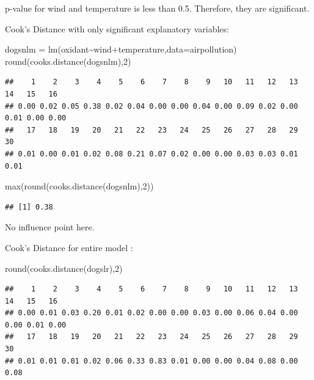 \documentclass[
]{article}
\newenvironment{Shaded}{\begin{snugshade}}{\end{snugshade}}
\newcommand{\AttributeTok}[1]{\textcolor[rgb]{0.77,0.63,0.00}{#1}}
\newcommand{\DecValTok}[1]{\textcolor[rgb]{0.00,0.00,0.81}{#1}}
\newcommand{\FunctionTok}[1]{\textcolor[rgb]{0.00,0.00,0.00}{#1}}
\newcommand{\NormalTok}[1]{#1}
\newcommand{\OtherTok}[1]{\textcolor[rgb]{0.56,0.35,0.01}{#1}}
\newcommand{\SpecialCharTok}[1]{\textcolor[rgb]{0.00,0.00,0.00}{#1}}
\begin{document}
p-value for wind and temperature is less than 0.5. Therefore, they are
significant.

Cook's Distance with only significant explanatory variables:

\begin{Shaded}
\begin{Highlighting}[]
\NormalTok{dogsnlm }\OtherTok{=} \FunctionTok{lm}\NormalTok{(oxidant}\SpecialCharTok{\textasciitilde{}}\NormalTok{wind}\SpecialCharTok{+}\NormalTok{temperature,}\AttributeTok{data=}\NormalTok{airpollution)}
\FunctionTok{round}\NormalTok{(}\FunctionTok{cooks.distance}\NormalTok{(dogsnlm),}\DecValTok{2}\NormalTok{)}
\end{Highlighting}
\end{Shaded}

\begin{verbatim}
##    1    2    3    4    5    6    7    8    9   10   11   12   13   14   15   16 
## 0.00 0.02 0.05 0.38 0.02 0.04 0.00 0.00 0.04 0.00 0.09 0.02 0.00 0.01 0.00 0.00 
##   17   18   19   20   21   22   23   24   25   26   27   28   29   30 
## 0.01 0.00 0.01 0.02 0.08 0.21 0.07 0.02 0.00 0.00 0.03 0.03 0.01 0.01
\end{verbatim}

\begin{Shaded}
\begin{Highlighting}[]
\FunctionTok{max}\NormalTok{(}\FunctionTok{round}\NormalTok{(}\FunctionTok{cooks.distance}\NormalTok{(dogsnlm),}\DecValTok{2}\NormalTok{))}
\end{Highlighting}
\end{Shaded}

\begin{verbatim}
## [1] 0.38
\end{verbatim}

No influence point here.

Cook's Distance for entire model :

\begin{Shaded}
\begin{Highlighting}[]
\FunctionTok{round}\NormalTok{(}\FunctionTok{cooks.distance}\NormalTok{(dogslr),}\DecValTok{2}\NormalTok{)}
\end{Highlighting}
\end{Shaded}

\begin{verbatim}
##    1    2    3    4    5    6    7    8    9   10   11   12   13   14   15   16 
## 0.00 0.01 0.03 0.20 0.01 0.02 0.00 0.00 0.03 0.00 0.06 0.04 0.00 0.00 0.01 0.00 
##   17   18   19   20   21   22   23   24   25   26   27   28   29   30 
## 0.01 0.01 0.01 0.02 0.06 0.33 0.83 0.01 0.00 0.00 0.04 0.08 0.00 0.08
\end{verbatim}
\end{document}
